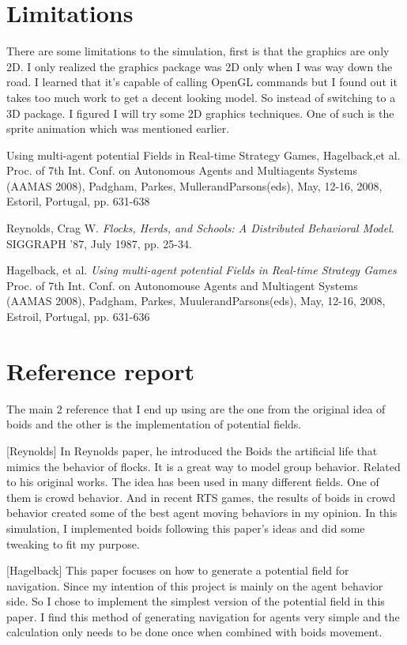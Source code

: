 \documentclass[letterpaper, 12pt]{article}
\begin{document}
\section*{Limitations}
There are some limitations to the simulation, first is that the graphics are only 2D. I only realized the graphics package was 2D only when I was way down the road. I learned that it's capable of calling OpenGL commands but I found out it takes too much work to get a decent looking model. So instead of switching to a 3D package. I figured I will try some 2D graphics techniques. One of such is the sprite animation which was mentioned earlier. 

Using multi-agent potential Fields in Real-time Strategy Games, Hagelback,et al. Proc. of 7th Int.
Conf. on Autonomous Agents and Multiagents Systems (AAMAS 2008), Padgham, Parkes, MullerandParsons(eds),
May, 12-16, 2008, Estoril, Portugal, pp. 631-638


\begin{thebibliography}{9}
     Reynolds, Crag W. \emph{Flocks, Herds, and Schools: A Distributed Behavioral Model}. SIGGRAPH '87, July 1987, pp. 25-34.


     Hagelback, et al. \emph{Using multi-agent potential Fields in Real-time Strategy Games} Proc. of 7th Int. Conf. on Autonomouse Agents and Multiagent Systems (AAMAS 2008), Padgham, Parkes, MuulerandParsons(eds), May, 12-16, 2008, Estroil, Portugal, pp. 631-636
\end{thebibliography}


\section*{Reference report}
The main 2 reference that I end up using are the one from the original idea of boids and the other is the implementation of potential fields. 

[Reynolds] In Reynolds paper, he introduced the Boids the artificial life that mimics the behavior of flocks. It is a great way to model group behavior. Related to his original works. The idea has been used in many different fields. One of them is crowd behavior. And in recent RTS games, the results of boids in crowd behavior created some of the best agent moving behaviors in my opinion. In this simulation, I implemented boids following this paper's ideas and did some tweaking to fit my purpose.

[Hagelback] This paper focuses on how to generate a potential field for navigation. Since my intention of this project is mainly on the agent behavior side. So I chose to implement the simplest version of the potential field in this paper. I find this method of generating navigation for agents very simple and the calculation only needs to be done once when combined with boids movement. 
\end{document}
